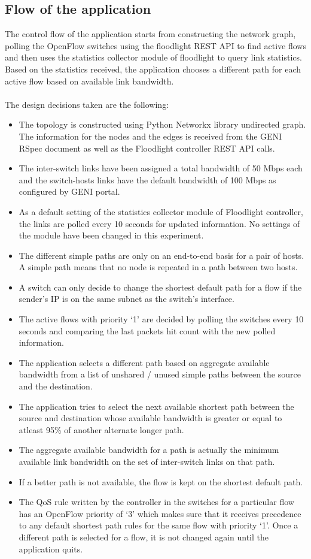\documentclass[paper=a4, fontsize=12pt]{scrartcl}	%
\numberwithin{equation}{section}		%
\numberwithin{figure}{section}			%
\numberwithin{table}{section}				%
\begin{document}
\subsection{Flow of the application}
The control flow of the application starts from constructing the network graph, polling the OpenFlow switches using the floodlight REST API to find active flows and then uses the statistics collector module of floodlight to query link statistics. Based on the statistics received, the application chooses a different path for each active flow based on available link bandwidth.
\\
\\
The design decisions taken are the following:
\begin{itemize}
\item The topology is constructed using Python Networkx library undirected graph. The information for the nodes and the edges is received from the GENI RSpec document as well as the Floodlight controller REST API calls.
\item The inter-switch links have been assigned a total bandwidth of 50 Mbps each and the switch-hosts links have the default bandwidth of 100 Mbps as configured by GENI portal.
\item As a default setting of the statistics collector module of Floodlight controller, the links are polled every 10 seconds for updated information. No settings of the module have been changed in this experiment.
\item The different simple paths are only on an end-to-end basis for a pair of hosts. A simple path means that no node is repeated in a path between two hosts.
\item A switch can only decide to change the shortest default path for a flow if the sender's IP is on the same subnet as the switch's interface.
\item The active flows with priority `1' are decided by polling the switches every 10 seconds and comparing the last packets hit count with the new polled information.
\item The application selects a different path based on aggregate available bandwidth from a list of unshared / unused simple paths between the source and the destination.
\item The application tries to select the next available shortest path between the source and destination whose available bandwidth is greater or equal to atleast 95\% of another alternate longer path.
\item The aggregate available bandwidth for a path is actually the minimum available link bandwidth on the set of inter-switch links on that path.
\item If a better path is not available, the flow is kept on the shortest default path.
\item The QoS rule written by the controller in the switches for a particular flow has an OpenFlow priority of `3' which makes sure that it receives precedence to any default shortest path rules for the same flow with priority `1'. Once a different path is selected for a flow, it is not changed again until the application quits.

\end{itemize}
\end{document}
